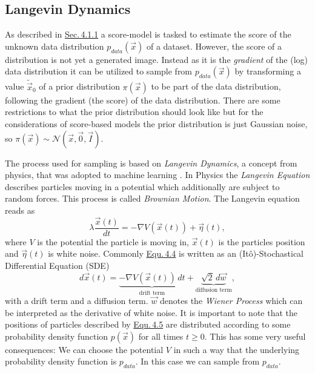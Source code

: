 \subsection{Langevin Dynamics} \label{sec:4.1.2}
As described in \hyperref[sec:4.1.1]{Sec.\,4.1.1} a score-model is tasked to estimate the score of the unknown data distribution $p_{data}(\vec{x})$ of a dataset. However, the score of a distribution is not yet a generated image. Instead as it is the \textit{gradient} of the (log) data distribution it can be utilized to sample from $p_{data}(\vec{x})$ by transforming a value $\tilde{\vec{x}}_0$ of a prior distribution $\pi(\vec{x})$ to be part of the data distribution, following the gradient (the score) of the data distribution. There are some restrictions to what the prior distribution should look like but for the considerations of score-based models the prior distribution is just Gaussian noise, so $\pi(\vec{x})\sim\mathcal{N}(\vec{x}, \vec{0}, \vec{I})$.

The process used for sampling is based on \textit{Langevin Dynamics}, a concept from physics, that was adopted to machine learning \cite{langevin1, langevin2}. In Physics the \textit{Langevin Equation} describes particles moving in a potential which additionally are subject to random forces. This process is called \textit{Brownian Motion}. The Langevin equation reads as 
%
\begin{equation} \label{equ:4.4}
    \lambda \frac{\vec{x}(t)}{dt}=-\nabla V(\vec{x}(t))+\vec{\eta}(t),
\end{equation}
%
where $V$ is the potential the particle is moving in, $\vec{x}(t)$ is the particles position and $\vec{\eta}(t)$ is white noise. Commonly \hyperref[equ:4.4]{Equ.\,4.4} is written as an (Itô)-Stochastical Differential Equation (SDE)
%
\begin{equation} \label{equ:4.5}
    d\vec{x}(t)=\underbrace{-\nabla V(\vec{x}(t))\,dt}_\text{drift term}+\underbrace{\sqrt{2}\,d\vec{w}}_\text{diffusion term},
\end{equation}
%
with a drift term and a diffusion term. $\vec{w}$ denotes the \textit{Wiener Process} \cite{gardiner} which can be interpreted as the derivative of white noise. It is important to note that the positions of particles described by \hyperref[equ:4.5]{Equ.\,4.5} are distributed according to some probability density function $p(\vec{x})$ for all times $t\geq0$. This has some very useful consequences: We can choose the potential $V$ in such a way that the underlying probability density function is $p_{data}$. In this case we can sample from $p_{data}$.


